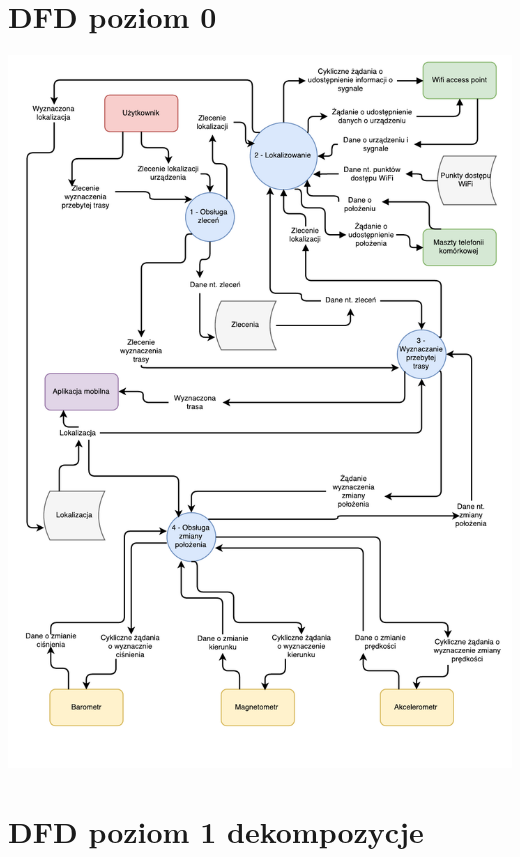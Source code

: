 \documentclass[11pt]{article}
\begin{document}
	\section{DFD poziom 0}
	\begin{center}
		\includegraphics[scale=0.8]{DFD0.pdf}
	\end{center}
	\newpage
	\section{DFD poziom 1 dekompozycje}
\end{document}
